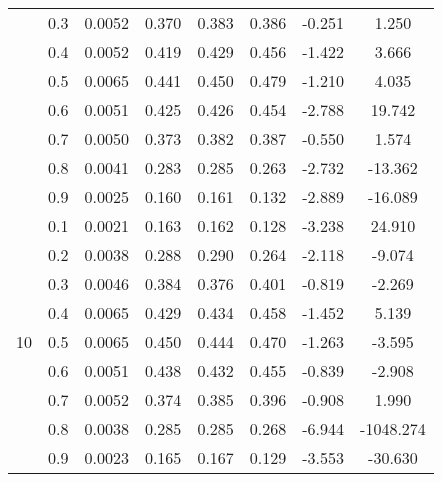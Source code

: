 \documentclass[11pt,a4paper]{report}
\begin{document}
\begin{longtable}{ | c | c || c | c | c | c | c | c | }
 & 0.3 & 0.0052 & 0.370 & 0.383 & 0.386 & -0.251 & 1.250 \\
 & 0.4 & 0.0052 & 0.419 & 0.429 & 0.456 & -1.422 & 3.666 \\
 & 0.5 & 0.0065 & 0.441 & 0.450 & 0.479 & -1.210 & 4.035 \\
 & 0.6 & 0.0051 & 0.425 & 0.426 & 0.454 & -2.788 & 19.742 \\
 & 0.7 & 0.0050 & 0.373 & 0.382 & 0.387 & -0.550 & 1.574 \\
 & 0.8 & 0.0041 & 0.283 & 0.285 & 0.263 & -2.732 & -13.362 \\
 & 0.9 & 0.0025 & 0.160 & 0.161 & 0.132 & -2.889 & -16.089 \\
 \hline
\multirow{9}{*}{10} & 0.1 & 0.0021 & 0.163 & 0.162 & 0.128 & -3.238 & 24.910 \\
 & 0.2 & 0.0038 & 0.288 & 0.290 & 0.264 & -2.118 & -9.074 \\
 & 0.3 & 0.0046 & 0.384 & 0.376 & 0.401 & -0.819 & -2.269 \\
 & 0.4 & 0.0065 & 0.429 & 0.434 & 0.458 & -1.452 & 5.139 \\
 & 0.5 & 0.0065 & 0.450 & 0.444 & 0.470 & -1.263 & -3.595 \\
 & 0.6 & 0.0051 & 0.438 & 0.432 & 0.455 & -0.839 & -2.908 \\
 & 0.7 & 0.0052 & 0.374 & 0.385 & 0.396 & -0.908 & 1.990 \\
 & 0.8 & 0.0038 & 0.285 & 0.285 & 0.268 & -6.944 & -1048.274 \\
 & 0.9 & 0.0023 & 0.165 & 0.167 & 0.129 & -3.553 & -30.630 \\
 \hline
\hline
\end{longtable}
\end{document}
